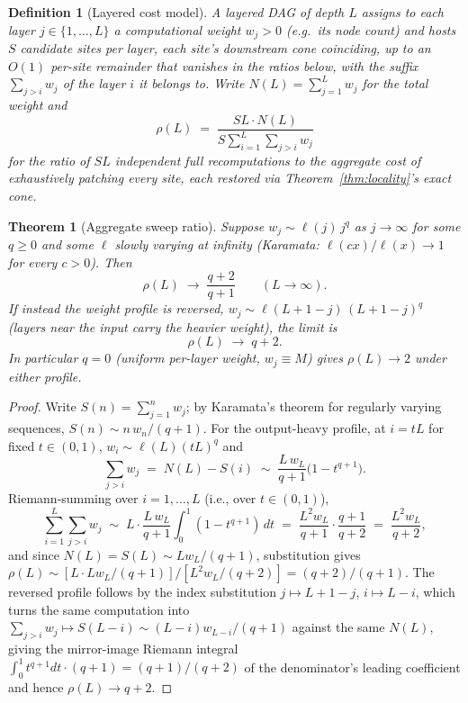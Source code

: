 \documentclass[11pt,a4paper]{article}
\newtheorem{theorem}{Theorem}
\newtheorem{definition}{Definition}
\begin{document}
\begin{definition}[Layered cost model]
\label{def:layered}
A \emph{layered DAG} of depth $L$ assigns to each layer $j \in \{1,\dots,L\}$ a computational
weight $w_j > 0$ (e.g.\ its node count) and hosts $S$ candidate sites per layer, each site's
downstream cone coinciding, up to an $O(1)$ per-site remainder that vanishes in the ratios below,
with the suffix $\sum_{j>i} w_j$ of the layer $i$ it belongs to. Write $N(L) = \sum_{j=1}^{L} w_j$
for the total weight and
\[
\rho(L) \;=\; \frac{S L \cdot N(L)}{S \sum_{i=1}^{L} \sum_{j>i} w_j}
\]
for the ratio of $SL$ independent full recomputations to the aggregate cost of exhaustively
patching every site, each restored via Theorem~\ref{thm:locality}'s exact cone.
\end{definition}

\begin{theorem}[Aggregate sweep ratio]
\label{thm:aggregate}
Suppose $w_j \sim \ell(j)\, j^{q}$ as $j \to \infty$ for some $q \ge 0$ and some $\ell$ slowly
varying at infinity (Karamata: $\ell(cx)/\ell(x) \to 1$ for every $c>0$). Then
\[
\rho(L) \;\longrightarrow\; \frac{q+2}{q+1} \qquad (L \to \infty).
\]
If instead the weight profile is reversed, $w_j \sim \ell(L{+}1{-}j)\,(L{+}1{-}j)^{q}$ (layers
near the \emph{input} carry the heavier weight), the limit is
\[
\rho(L) \;\longrightarrow\; q+2.
\]
In particular $q=0$ (uniform per-layer weight, $w_j \equiv M$) gives $\rho(L) \to 2$ under either
profile.
\end{theorem}

\begin{proof}
Write $S(n) = \sum_{j=1}^n w_j$; by Karamata's theorem for regularly varying sequences,
$S(n) \sim n\,w_n/(q+1)$. For the output-heavy profile, at $i=tL$ for fixed $t\in(0,1)$,
$w_i \sim \ell(L)(tL)^q$ and
\[
\sum_{j>i} w_j \;=\; N(L)-S(i) \;\sim\; \frac{L\,w_L}{q+1}\big(1-t^{q+1}\big).
\]
Riemann-summing over $i=1,\dots,L$ (i.e., over $t\in(0,1)$),
\[
\sum_{i=1}^{L}\sum_{j>i} w_j \;\sim\; L\cdot\frac{L\,w_L}{q+1}\int_0^1(1-t^{q+1})\,dt
\;=\; \frac{L^2 w_L}{q+1}\cdot\frac{q+1}{q+2} \;=\; \frac{L^2 w_L}{q+2},
\]
and since $N(L)=S(L)\sim Lw_L/(q+1)$, substitution gives
$\rho(L)\sim [L\cdot Lw_L/(q+1)]/[L^2w_L/(q+2)] = (q+2)/(q+1)$. The reversed profile follows by
the index substitution $j\mapsto L{+}1{-}j$, $i\mapsto L{-}i$, which turns the same computation
into $\sum_{j>i}w_j \mapsto S(L-i) \sim (L-i)w_{L-i}/(q+1)$ against the same $N(L)$, giving the
mirror-image Riemann integral $\int_0^1 t^{q+1}dt \cdot (q+1) = (q+1)/(q+2)$ of the denominator's
leading coefficient and hence $\rho(L)\to q+2$.
\end{proof}
\end{document}
